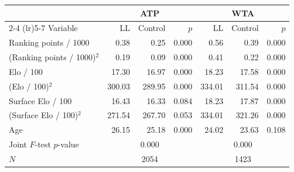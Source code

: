 \begin{tabular}{l rrr rrr}
\toprule
 & \multicolumn{3}{c}{ATP} & \multicolumn{3}{c}{WTA} \\
\cmidrule(lr){2-4} \cmidrule(lr){5-7}
Variable & LL & Control & $p$ & LL & Control & $p$ \\
\midrule
Ranking points / 1000 & 0.38 & 0.25 & 0.000 & 0.56 & 0.39 & 0.000 \\
(Ranking points / 1000)$^2$ & 0.19 & 0.09 & 0.000 & 0.41 & 0.22 & 0.000 \\
Elo / 100 & 17.30 & 16.97 & 0.000 & 18.23 & 17.58 & 0.000 \\
(Elo / 100)$^2$ & 300.03 & 289.95 & 0.000 & 334.01 & 311.54 & 0.000 \\
Surface Elo / 100 & 16.43 & 16.33 & 0.084 & 18.23 & 17.87 & 0.000 \\
(Surface Elo / 100)$^2$ & 271.54 & 267.70 & 0.053 & 334.01 & 321.26 & 0.000 \\
Age & 26.15 & 25.18 & 0.000 & 24.02 & 23.63 & 0.108 \\
\midrule
Joint $F$-test $p$-value & \multicolumn{3}{c}{0.000} & \multicolumn{3}{c}{0.000} \\
$N$ & \multicolumn{3}{c}{2054} & \multicolumn{3}{c}{1423} \\
\bottomrule
\end{tabular}
